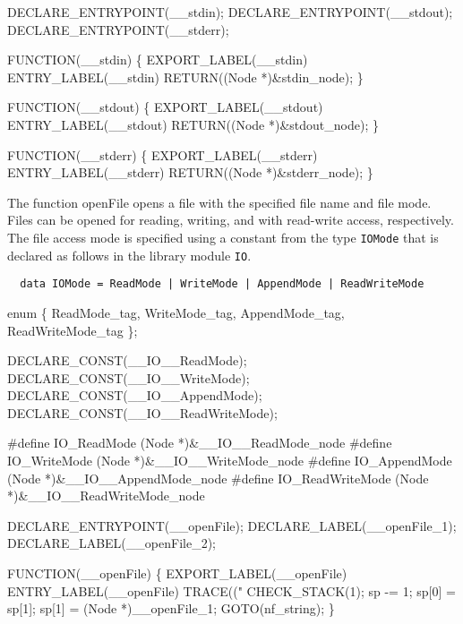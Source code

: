 DECLARE_ENTRYPOINT(__stdin);
DECLARE_ENTRYPOINT(__stdout);
DECLARE_ENTRYPOINT(__stderr);

FUNCTION(__stdin)
\{
    EXPORT_LABEL(__stdin)
 ENTRY_LABEL(__stdin)
    RETURN((Node *)&stdin_node);
\}

FUNCTION(__stdout)
\{
    EXPORT_LABEL(__stdout)
 ENTRY_LABEL(__stdout)
    RETURN((Node *)&stdout_node);
\}

FUNCTION(__stderr)
\{
    EXPORT_LABEL(__stderr)
 ENTRY_LABEL(__stderr)
    RETURN((Node *)&stderr_node);
\}

\nwendcode{}\nwdocspar
The function {\Tt{}openFile\nwendquote} opens a file with the specified file name
and file mode. Files can be opened for reading, writing, and with
read-write access, respectively. The file access mode is specified
using a constant from the type \texttt{IOMode} that is declared as
follows in the library module \texttt{IO}.
\begin{verbatim}
  data IOMode = ReadMode | WriteMode | AppendMode | ReadWriteMode
\end{verbatim}


\nwenddocs{}\plusendmoddef\nwstartdeflinemarkup{}\nwenddeflinemarkup
enum \{
    ReadMode_tag,
    WriteMode_tag,
    AppendMode_tag,
    ReadWriteMode_tag
\};

DECLARE_CONST(__IO__ReadMode);
DECLARE_CONST(__IO__WriteMode);
DECLARE_CONST(__IO__AppendMode);
DECLARE_CONST(__IO__ReadWriteMode);

#define IO_ReadMode      (Node *)&__IO__ReadMode_node
#define IO_WriteMode     (Node *)&__IO__WriteMode_node
#define IO_AppendMode    (Node *)&__IO__AppendMode_node
#define IO_ReadWriteMode (Node *)&__IO__ReadWriteMode_node

DECLARE_ENTRYPOINT(__openFile);
DECLARE_LABEL(__openFile_1);
DECLARE_LABEL(__openFile_2);


FUNCTION(__openFile)
\{
    EXPORT_LABEL(__openFile)
 ENTRY_LABEL(__openFile)
    TRACE(("%
    CHECK_STACK(1);
    sp   -= 1;
    sp[0] = sp[1];
    sp[1] = (Node *)__openFile_1;
    GOTO(nf_string);
\}

